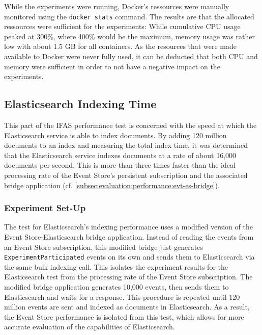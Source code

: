
While the experiments were running, Docker's ressources were manually monitored using the \texttt{docker stats} command.
The results are that the allocated ressources were sufficient for the experiments:
While cumulative CPU usage peaked at 300\%, where 400\% would be the maximum, memory usage was rather low with about 1.5 GB for all containers.
As the resources that were made available to Docker were never fully used, it can be deducted that both CPU and memory were sufficient in order to not have a negative impact on the experiments.

\subsection{Elasticsearch Indexing Time}
\label{subsec:evaluation:performance:elasticsearch}

This part of the \ac{IFAS} performance test is concerned with the speed at which the Elasticsearch service is able to index documents.
By adding 120 million documents to an index and measuring the total index time, it was determined that the Elasticsearch service indexes documents at a rate of about 16,000 documents per second.
This is more than three times faster than the ideal processing rate of the Event Store's persistent subscription and the associated bridge application (cf. \cref{subsec:evaluation:performance:evt-es-bridge}).

\subsubsection{Experiment Set-Up}

The test for Elasticsearch's indexing performance uses a modified version of the Event Store-Elasticsearch bridge application.
Instead of reading the events from an Event Store subscription, this modified bridge just generates \texttt{ExperimentParticipated} events on its own and sends them to Elasticsearch via the same bulk indexing call.
This isolates the experiment results for the Elasticsearch test from the processing rate of the Event Store subscription.
The modified bridge application generates 10,000 events, then sends them to Elasticsearch and waits for a response.
This procedure is repeated until 120 million events are sent and indexed as documents in Elasticsearch.
As a result, the Event Store performance is isolated from this test, which allows for more accurate evaluation of the capabilities of Elasticsearch.

